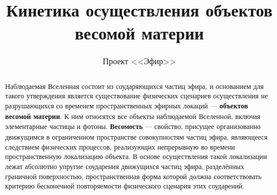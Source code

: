 \title{Кинетика осуществления объектов весомой материи}
\author{Проект <<Эфир>>}
\date{}
\maketitle

\begin{abstract}
Наблюдаемая Вселенная состоит из соударяющихся частиц эфира, и основанием для такого утверждения является существование физических сценариев осуществления не разрушающихся со временем пространственных эфирных локаций — \textbf{объектов весомой материи}. К ним относятся все объекты наблюдаемой Вселенной, включая элементарные частицы и фотоны. \textbf{Весомость} — свойство, присущее организованно движущимся в ограниченном пространстве совокупностям частиц эфира, являющееся следствием физических процессов, реализующих непрерывную во времени пространственную локализацию объекта. В основе осуществления такой локализации лежат абсолютно упругие соударения движущихся частиц эфира, разделённых граничной поверхностью, пространственная форма которой должна соответствовать критерию бесконечной повторяемости физического сценария этих соударений.
\end{abstract}
\vspace{2em}
